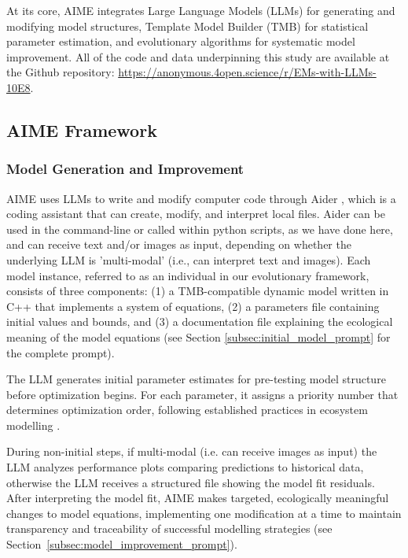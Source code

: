 At its core, AIME integrates Large Language Models (LLMs) for generating and modifying model structures, Template Model Builder (TMB) for statistical parameter estimation, and evolutionary algorithms for systematic model improvement. All of the code and data underpinning this study are available at the Github repository: \url{https://anonymous.4open.science/r/EMs-with-LLMs-10E8}.

\subsection{AIME Framework}

\subsubsection{Model Generation and Improvement}
AIME uses LLMs to write and modify computer code through Aider \citep{gauthier2024aider}, which is a coding assistant that can create, modify, and interpret local files. Aider can be used in the command-line or called within python scripts, as we have done here, and can receive text and/or images as input, depending on whether the underlying LLM is 'multi-modal' (i.e., can interpret text and images). Each model instance, referred to as an individual in our evolutionary framework, consists of three components: (1) a TMB-compatible dynamic model written in C++ that implements a system of equations, (2) a parameters file containing initial values and bounds, and (3) a documentation file explaining the ecological meaning of the model equations (see Section \ref{subsec:initial_model_prompt} for the complete prompt).

The LLM generates initial parameter estimates for pre-testing model structure before optimization begins. For each parameter, it assigns a priority number that determines optimization order, following established practices in ecosystem modelling \citep{Plaganyi_Punt_Hillary_Morello_Thebaud_Hutton_Pillans_Thorson_Fulton_Smith_et_al_2014}.

During non-initial steps, if multi-modal (i.e. can receive images as input) the LLM analyzes performance plots comparing predictions to historical data, otherwise the LLM receives a structured file showing the model fit residuals. After interpreting the model fit, AIME makes targeted, ecologically meaningful changes to model equations, implementing one modification at a time to maintain transparency and traceability of successful modelling strategies (see Section~\ref{subsec:model_improvement_prompt}).

